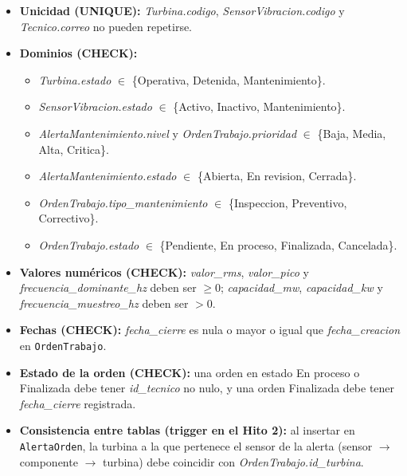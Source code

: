 \documentclass[11pt,a4paper]{article}
\begin{document}
\begin{itemize}
    \item \textbf{Unicidad (UNIQUE):} \textit{Turbina.codigo},
    \textit{SensorVibracion.codigo} y \textit{Tecnico.correo} no pueden repetirse.

    \item \textbf{Dominios (CHECK):}
    \begin{itemize}
        \item \textit{Turbina.estado} $\in$ \{Operativa, Detenida, Mantenimiento\}.
        \item \textit{SensorVibracion.estado} $\in$ \{Activo, Inactivo, Mantenimiento\}.
        \item \textit{AlertaMantenimiento.nivel} y \textit{OrdenTrabajo.prioridad}
        $\in$ \{Baja, Media, Alta, Critica\}.
        \item \textit{AlertaMantenimiento.estado} $\in$ \{Abierta, En revision, Cerrada\}.
        \item \textit{OrdenTrabajo.tipo\_mantenimiento} $\in$ \{Inspeccion, Preventivo,
        Correctivo\}.
        \item \textit{OrdenTrabajo.estado} $\in$ \{Pendiente, En proceso, Finalizada,
        Cancelada\}.
    \end{itemize}

    \item \textbf{Valores numéricos (CHECK):} \textit{valor\_rms},
    \textit{valor\_pico} y \textit{frecuencia\_dominante\_hz} deben ser $\geq 0$;
    \textit{capacidad\_mw}, \textit{capacidad\_kw} y
    \textit{frecuencia\_muestreo\_hz} deben ser $> 0$.

    \item \textbf{Fechas (CHECK):} \textit{fecha\_cierre} es nula o mayor o igual que
    \textit{fecha\_creacion} en \texttt{OrdenTrabajo}.

    \item \textbf{Estado de la orden (CHECK):} una orden en estado En proceso o
    Finalizada debe tener \textit{id\_tecnico} no nulo, y una orden Finalizada debe
    tener \textit{fecha\_cierre} registrada.

    \item \textbf{Consistencia entre tablas (trigger en el Hito 2):} al insertar en
    \texttt{AlertaOrden}, la turbina a la que pertenece el sensor de la alerta
    (sensor $\rightarrow$ componente $\rightarrow$ turbina) debe coincidir con
    \textit{OrdenTrabajo.id\_turbina}.
\end{itemize}
\end{document}
